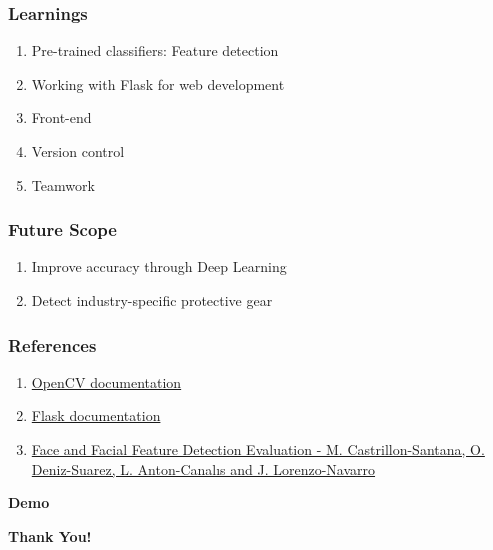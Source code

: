 \documentclass[14pt]{beamer}
\begin{document}
\begin{frame}
    \frametitle{Learnings}
    \begin{enumerate}
        \item Pre-trained classifiers: Feature detection
        \item Working with Flask for web development
        \item Front-end
        \item Version control  
        \item Teamwork
    \end{enumerate}
\end{frame}

\begin{frame}
    \frametitle{Future Scope}
    \begin{enumerate}
        \item Improve accuracy through Deep Learning
        \item Detect industry-specific protective gear
    \end{enumerate}
\end{frame}


\begin{frame}
    \frametitle{References}
    \begin{enumerate}
        \item \href{https://opencv.org/}{OpenCV documentation} 
        \item \href{https://flask.palletsprojects.com/en/1.1.x/}{Flask documentation} 
        \item \href{http://alereimondo.no-ip.org/OpenCV/uploads/37/CameraReadyPaper63.pdf}{Face and Facial Feature Detection Evaluation  \newline - M. Castrillon-Santana, O. Deniz-Suarez, L. Anton-Canalıs and J. Lorenzo-Navarro}
    \end{enumerate}
\end{frame}

\begin{frame}[c]{ }
    \centering
\huge \textbf{Demo}
\end{frame}

\begin{frame}[c]{ }
    \centering
\huge \textbf{Thank You!}
\end{frame}
\end{document}
